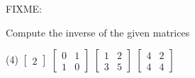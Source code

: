 FIXME:

\setcounter{exercise}{100}

\begin{exercise}
Compute the inverse of the given matrices
\begin{tasks}(4)
\task
$\begin{bmatrix}
2
\end{bmatrix}$
\task
$\begin{bmatrix}
0 & 1 \\
1 & 0
\end{bmatrix}$
\task
$\begin{bmatrix}
1 & 2 \\
3 & 5
\end{bmatrix}$
\task
$\begin{bmatrix}
4 & 2 \\
4 & 4
\end{bmatrix}$
\end{tasks}
\end{exercise}

